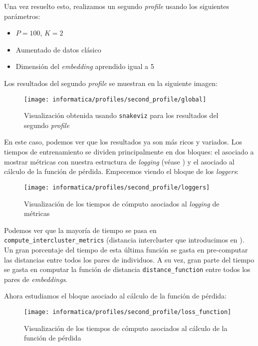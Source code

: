 Una vez resuelto esto, realizamos un segundo \textit{profile} usando los siguientes parámetros:

\begin{itemize}
    \item $P = 100$, $K = 2$
    \item Aumentado de datos clásico
    \item Dimensión del \textit{embedding} aprendido igual a 5
\end{itemize}

Los resultados del segundo \textit{profile} se muestran en la siguiente imagen:

\begin{figure}[H]
    \centering
    \texttt{[image: informatica/profiles/second\_profile/global]}
    \caption{Visualización obtenida usando \lstinline{snakeviz} para los resultados del segundo \textit{profile}}
\end{figure}

En este caso, podemos ver que los resultados ya son más ricos y variados. Los tiempos de entrenamiento se dividen principalmente en dos bloques: el asociado a mostrar métricas con nuestra estructura de \textit{logging} (véase ) y el asociado al cálculo de la función de pérdida. Empecemos viendo el bloque de los \textit{loggers}:

\begin{figure}[H]
    \centering
    \texttt{[image: informatica/profiles/second\_profile/loggers]}
    \caption{Visualización de los tiempos de cómputo asociados al \textit{logging} de métricas}
    \label{img:second_profile_tiempos_metricas}
\end{figure}

Podemos ver que la mayoría de tiempo se pasa en \lstinline{compute_intercluster_metrics} (distancia intercluster que introducimos en ). Un gran porcentaje del tiempo de esta última función se gasta en pre-computar las distancias entre todos los pares de individuos. A su vez, gran parte del tiempo se gasta en computar la función de distancia \lstinline{distance_function} entre todos los pares de \textit{embeddings}.

Ahora estudiamos el bloque asociado al cálculo de la función de pérdida:

\begin{figure}[H]
    \centering
    \texttt{[image: informatica/profiles/second\_profile/loss\_function]}
    \caption{Visualización de los tiempos de cómputo asociados al cálculo de la función de pérdida}
\end{figure}

